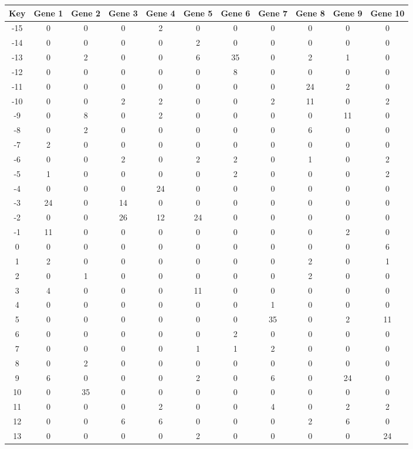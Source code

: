 \begin{tabular}{|c|c|c|c|c|c|c|c|c|c|c|}
\hline
Key & Gene 1 & Gene 2 & Gene 3 & Gene 4 & Gene 5 & Gene 6 & Gene 7 & Gene 8 & Gene 9 & Gene 10 \\
\hline
-15 & 0 & 0 & 0 & 2 & 0 & 0 & 0 & 0 & 0 & 0 \\
-14 & 0 & 0 & 0 & 0 & 2 & 0 & 0 & 0 & 0 & 0 \\
-13 & 0 & 2 & 0 & 0 & 6 & 35 & 0 & 2 & 1 & 0 \\
-12 & 0 & 0 & 0 & 0 & 0 & 8 & 0 & 0 & 0 & 0 \\
-11 & 0 & 0 & 0 & 0 & 0 & 0 & 0 & 24 & 2 & 0 \\
-10 & 0 & 0 & 2 & 2 & 0 & 0 & 2 & 11 & 0 & 2 \\
-9 & 0 & 8 & 0 & 2 & 0 & 0 & 0 & 0 & 11 & 0 \\
-8 & 0 & 2 & 0 & 0 & 0 & 0 & 0 & 6 & 0 & 0 \\
-7 & 2 & 0 & 0 & 0 & 0 & 0 & 0 & 0 & 0 & 0 \\
-6 & 0 & 0 & 2 & 0 & 2 & 2 & 0 & 1 & 0 & 2 \\
-5 & 1 & 0 & 0 & 0 & 0 & 2 & 0 & 0 & 0 & 2 \\
-4 & 0 & 0 & 0 & 24 & 0 & 0 & 0 & 0 & 0 & 0 \\
-3 & 24 & 0 & 14 & 0 & 0 & 0 & 0 & 0 & 0 & 0 \\
-2 & 0 & 0 & 26 & 12 & 24 & 0 & 0 & 0 & 0 & 0 \\
-1 & 11 & 0 & 0 & 0 & 0 & 0 & 0 & 0 & 2 & 0 \\
0 & 0 & 0 & 0 & 0 & 0 & 0 & 0 & 0 & 0 & 6 \\
1 & 2 & 0 & 0 & 0 & 0 & 0 & 0 & 2 & 0 & 1 \\
2 & 0 & 1 & 0 & 0 & 0 & 0 & 0 & 2 & 0 & 0 \\
3 & 4 & 0 & 0 & 0 & 11 & 0 & 0 & 0 & 0 & 0 \\
4 & 0 & 0 & 0 & 0 & 0 & 0 & 1 & 0 & 0 & 0 \\
5 & 0 & 0 & 0 & 0 & 0 & 0 & 35 & 0 & 2 & 11 \\
6 & 0 & 0 & 0 & 0 & 0 & 2 & 0 & 0 & 0 & 0 \\
7 & 0 & 0 & 0 & 0 & 1 & 1 & 2 & 0 & 0 & 0 \\
8 & 0 & 2 & 0 & 0 & 0 & 0 & 0 & 0 & 0 & 0 \\
9 & 6 & 0 & 0 & 0 & 2 & 0 & 6 & 0 & 24 & 0 \\
10 & 0 & 35 & 0 & 0 & 0 & 0 & 0 & 0 & 0 & 0 \\
11 & 0 & 0 & 0 & 2 & 0 & 0 & 4 & 0 & 2 & 2 \\
12 & 0 & 0 & 6 & 6 & 0 & 0 & 0 & 2 & 6 & 0 \\
13 & 0 & 0 & 0 & 0 & 2 & 0 & 0 & 0 & 0 & 24 \\
\hline
\end{tabular}